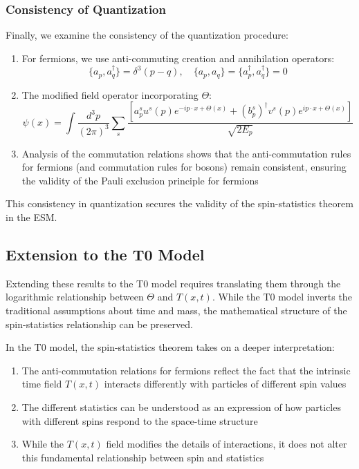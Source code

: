 \documentclass[12pt,a4paper]{article}
\newcommand{\Tfieldt}{T(x,t)}
\begin{document}
	\subsubsection{Consistency of Quantization}
	\label{subsubsec:quantization_consistency}
	
	Finally, we examine the consistency of the quantization procedure:
	
	\begin{enumerate}
		\item For fermions, we use anti-commuting creation and annihilation operators:
		\begin{equation}
			\{a_p, a^{\dagger}_q\} = \delta^3(p-q), \quad \{a_p, a_q\} = \{a^{\dagger}_p, a^{\dagger}_q\} = 0
			\label{eq:fermion_operators}
		\end{equation}
		
		\item The modified field operator incorporating $\Theta$:
		\begin{equation}
			\psi(x) = \int\frac{d^3p}{(2\pi)^3} \sum_s \frac{[a_p^s u^s(p)e^{-ip\cdot x+\Theta(x)} + (b_p^s)^{\dagger}v^s(p)e^{ip\cdot x+\Theta(x)}]}{\sqrt{2E_p}}
			\label{eq:modified_field_operator}
		\end{equation}
		
		\item Analysis of the commutation relations shows that the anti-commutation rules for fermions (and commutation rules for bosons) remain consistent, ensuring the validity of the Pauli exclusion principle for fermions
	\end{enumerate}
	
	This consistency in quantization secures the validity of the spin-statistics theorem in the ESM.
	
	\subsection{Extension to the T0 Model}
	\label{subsec:t0_extension}
	
	Extending these results to the T0 model requires translating them through the logarithmic relationship between $\Theta$ and $\Tfieldt$. While the T0 model inverts the traditional assumptions about time and mass, the mathematical structure of the spin-statistics relationship can be preserved.
	
	In the T0 model, the spin-statistics theorem takes on a deeper interpretation:
	
	\begin{enumerate}
		\item The anti-commutation relations for fermions reflect the fact that the intrinsic time field $\Tfieldt$ interacts differently with particles of different spin values
		\item The different statistics can be understood as an expression of how particles with different spins respond to the space-time structure
		\item While the $\Tfieldt$ field modifies the details of interactions, it does not alter this fundamental relationship between spin and statistics
	\end{enumerate}
	
\end{document}
